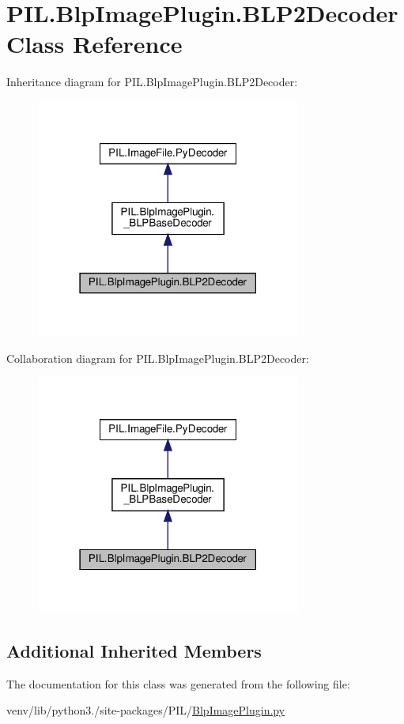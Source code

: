 \hypertarget{classPIL_1_1BlpImagePlugin_1_1BLP2Decoder}{}\section{P\+I\+L.\+Blp\+Image\+Plugin.\+B\+L\+P2\+Decoder Class Reference}
\label{classPIL_1_1BlpImagePlugin_1_1BLP2Decoder}


Inheritance diagram for P\+I\+L.\+Blp\+Image\+Plugin.\+B\+L\+P2\+Decoder\+:
\nopagebreak
\begin{figure}[H]
\begin{center}
\leavevmode
\includegraphics[width=247pt]{classPIL_1_1BlpImagePlugin_1_1BLP2Decoder__inherit__graph}
\end{center}
\end{figure}


Collaboration diagram for P\+I\+L.\+Blp\+Image\+Plugin.\+B\+L\+P2\+Decoder\+:
\nopagebreak
\begin{figure}[H]
\begin{center}
\leavevmode
\includegraphics[width=247pt]{classPIL_1_1BlpImagePlugin_1_1BLP2Decoder__coll__graph}
\end{center}
\end{figure}
\subsection*{Additional Inherited Members}


The documentation for this class was generated from the following file\+:\begin{DoxyCompactItemize}
\item 
venv/lib/python3./site-\/packages/\+P\+I\+L/\hyperlink{BlpImagePlugin_8py}{Blp\+Image\+Plugin.\+py}\end{DoxyCompactItemize}
